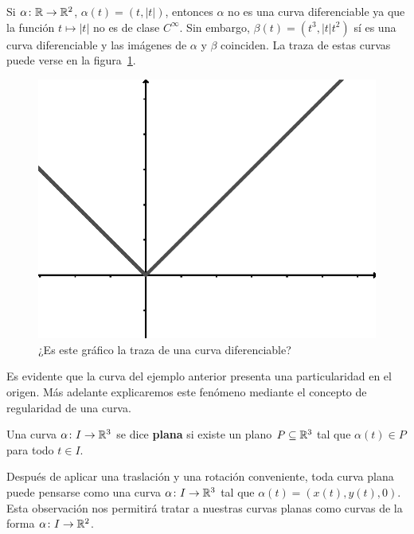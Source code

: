 \begin{example}
	Si $\alpha\colon\mathbb{R}\to\mathbb{R}^2$, $\alpha(t)=(t,|t|)$, entonces $\alpha$ no es
	una curva diferenciable ya que la función $t\mapsto |t|$ no es de clase
	$C^{\infty}$. Sin embargo, $\beta(t)=(t^3,|t|t^2)$ sí es una curva
	diferenciable y las imágenes de $\alpha$ y $\beta$ coinciden. La traza de
	estas curvas puede verse en la figura~\ref{fig:abs}.
	\begin{figure}
		\centering
    	\includegraphics[scale=0.5]{eps/abs}
		\caption{¿Es este gráfico la traza de una curva diferenciable?}
		\label{fig:abs}
	\end{figure}
\end{example}

Es evidente que la curva del ejemplo anterior presenta una particularidad en el
origen. Más adelante explicaremos este fenómeno mediante el concepto de
regularidad de una curva.

\begin{definition}
	Una curva $\alpha\colon I\to\mathbb{R}^3$ se dice \textbf{plana} si existe un plano
	$P\subseteq\mathbb{R}^3$ tal que $\alpha(t)\in P$ para todo $t\in I$.
\end{definition}

Después de aplicar una traslación y una rotación conveniente, 
toda curva plana puede pensarse como una curva
$\alpha\colon I\to\mathbb{R}^3$ tal que $\alpha(t)=(x(t),y(t),0)$. Esta observación nos
permitirá tratar a nuestras curvas planas como curvas de la forma $\alpha\colon
I\to\mathbb{R}^2$. 

